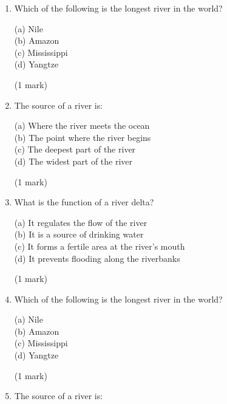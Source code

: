 \documentclass{article}
\begin{document}
\begin{enumerate} 

    \item Which of the following is the longest river in the world?
    
    (a)  Nile \\
    (b)  Amazon \\
    (c)  Mississippi \\ 
    (d)  Yangtze 

\hfill\raggedright (1 mark) 
\vspace{5pt}
\hline
\vspace{7pt}

    \item The source of a river is:
    
    (a) Where the river meets the ocean \\
    (b)  The point where the river begins \\
    (c) The deepest part of the river \\
    (d) The widest part of the river 

\hfill\raggedright (1 mark) 
\vspace{5pt}
\hline
\vspace{7pt}

    \item What is the function of a river delta?
    
    (a) It regulates the flow of the river \\
    (b) It is a source of drinking water \\
    (c) It forms a fertile area at the river's mouth \\
    (d) It prevents flooding along the riverbanks 

\hfill\raggedright (1 mark) 
\vspace{5pt}
\hline
\vspace{7pt} 

    \item Which of the following is the longest river in the world?
    
    (a) Nile \\
    (b) Amazon \\
    (c) Mississippi \\
    (d) Yangtze 
    
\hfill\raggedright (1 mark) 
\vspace{5pt}
\hline
\vspace{7pt}

    \item The source of a river is:
    

\end{enumerate}
\end{document}
